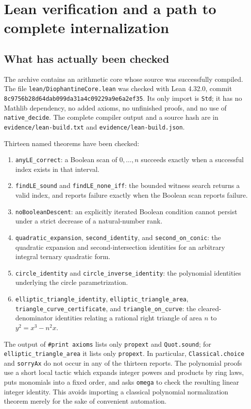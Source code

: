 \section{Lean verification and a path to complete internalization}
\label{sec:lean}

\subsection{What has actually been checked}

The archive contains an arithmetic core whose source was successfully
compiled. The file \texttt{lean/DiophantineCore.lean} was checked
with Lean 4.32.0, commit
\nolinkurl{8c9756b28d64dab099da31a4c09229a9e6a2ef35}. Its only import is
\texttt{Std}; it has no Mathlib dependency, no added axioms, no unfinished
proofs, and no use of \texttt{native\_decide}.  The complete compiler output
and a source hash are in \texttt{evidence/lean-build.txt} and
\texttt{evidence/lean-build.json}.

Thirteen named theorems have been checked:
\begin{enumerate}
\item \texttt{anyLE\_correct}: a Boolean scan of $0,\ldots,n$ succeeds
  exactly when a successful index exists in that interval.
\item \texttt{findLE\_sound} and \texttt{findLE\_none\_iff}: the bounded
  witness search returns a valid index, and reports failure exactly when
  the Boolean scan reports failure.
\item \texttt{noBooleanDescent}: an explicitly iterated Boolean condition
  cannot persist under a strict decrease of a natural-number rank.
\item \texttt{quadratic\_expansion}, \texttt{second\_identity}, and
  \texttt{second\_on\_conic}: the quadratic expansion and second-intersection
  identities for an arbitrary integral ternary quadratic form.
\item \texttt{circle\_identity} and \texttt{circle\_inverse\_identity}:
  the polynomial identities underlying the circle parametrization.
\item \texttt{elliptic\_triangle\_identity},
  \texttt{elliptic\_triangle\_area},
  \texttt{triangle\_curve\_certificate}, and
  \texttt{triangle\_on\_curve}: the cleared-denominator identities relating
  a rational right triangle of area $n$ to $y^2=x^3-n^2x$.
\end{enumerate}

The output of \texttt{\#print axioms} lists only
\texttt{propext} and \texttt{Quot.sound}; for
\texttt{elliptic\_triangle\_area} it lists only \texttt{propext}.
In particular, \texttt{Classical.choice} and \texttt{sorryAx} do not occur
in any of the thirteen reports.  The polynomial proofs use a short local
tactic which expands integer powers and products by ring laws, puts
monomials into a fixed order, and asks \texttt{omega} to check the resulting
linear integer identity.  This avoids importing a classical polynomial
normalization theorem merely for the sake of convenient automation.

